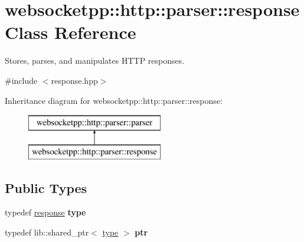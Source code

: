 \hypertarget{classwebsocketpp_1_1http_1_1parser_1_1response}{}\section{websocketpp\+:\+:http\+:\+:parser\+:\+:response Class Reference}
\label{classwebsocketpp_1_1http_1_1parser_1_1response}


Stores, parses, and manipulates H\+T\+TP responses.  




{\ttfamily \#include $<$response.\+hpp$>$}

Inheritance diagram for websocketpp\+:\+:http\+:\+:parser\+:\+:response\+:\begin{figure}[H]
\begin{center}
\leavevmode
\includegraphics[height=2.000000cm]{classwebsocketpp_1_1http_1_1parser_1_1response}
\end{center}
\end{figure}
\subsection*{Public Types}
\begin{DoxyCompactItemize}
\item 
typedef \hyperlink{classwebsocketpp_1_1http_1_1parser_1_1response}{response} {\bfseries type}\hypertarget{classwebsocketpp_1_1http_1_1parser_1_1response_ac8666204343c97725f35fd1aa8573c2b}{}\label{classwebsocketpp_1_1http_1_1parser_1_1response_ac8666204343c97725f35fd1aa8573c2b}

\item 
typedef lib\+::shared\+\_\+ptr$<$ \hyperlink{classwebsocketpp_1_1http_1_1parser_1_1response}{type} $>$ {\bfseries ptr}\hypertarget{classwebsocketpp_1_1http_1_1parser_1_1response_a4072a02adfa5e60b4e23246d561d9c25}{}\label{classwebsocketpp_1_1http_1_1parser_1_1response_a4072a02adfa5e60b4e23246d561d9c25}

\end{DoxyCompactItemize}
